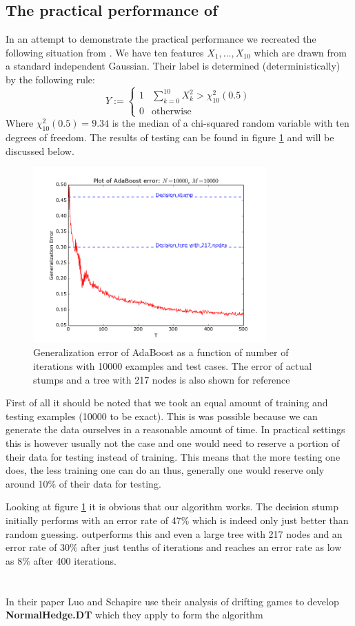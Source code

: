 \subsection{The practical performance of \adaB}
\label{subsec:pracPerf}
In an attempt to demonstrate the practical performance we recreated the following situation from \cite{Hastie2009}. We have ten features $X_1,\ldots,X_{10}$ which are drawn from a standard independent Gaussian. Their label is determined (deterministically) by the following rule: $$Y:=\begin{cases}
1 & \sum_{k=0}^{10} X^2_k > \chi_{10}^2(0.5)\\
0 & \text{otherwise}
\end{cases}$$ Where $\chi_{10}^2(0.5)=9.34$ is the median of a chi-squared random variable with ten degrees of freedom. The results of testing can be found in figure \ref{fig:adaB} and will be discussed below. 

\begin{figure}[!ht]
  \centering
      \includegraphics[width=0.8\textwidth]{generated/longCorrect.png}
  \caption{Generalization error of AdaBoost as a function of number of iterations with 10000 examples and test cases. The error of actual stumps and a tree with 217 nodes is also shown for reference}
      \label{fig:adaB}
\end{figure}

First of all it should be noted that we took an equal amount of training and testing examples (10000 to be exact). This is was possible because we can generate the data ourselves in a reasonable amount of time. In practical settings this is however usually not the case and one would need to reserve a portion of their data for testing instead of training. This means that the more testing one does, the less training one can do an thus, generally one would reserve only around 10\% of their data for testing.
\par Looking at figure \ref{fig:adaB} it is obvious that our algorithm works. The decision stump initially performs with an error rate of 47\% which is indeed only just better than random guessing. \adaB outperforms this and even a large tree with 217 nodes and an error rate of 30\% after just tenths of iterations and reaches an error rate as low as 8\% after 400 iterations. 

\section{\adaN}
\label{sec:adaN}
In their paper \cite{Luo2014} Luo and Schapire use their analysis of drifting games to develop \textbf{NormalHedge.DT} which they apply to form the algorithm \NHB 